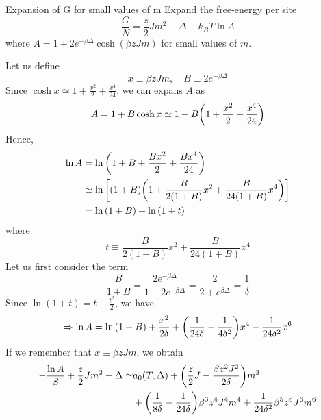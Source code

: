 \documentclass[../../Main/Main.tex]{subfiles}
\begin{document}
\begin{exercise}{Expansion of G for small values of m }{}
Expand the free-energy per site
\begin{equation*}
  \frac{G}{N} = \frac{z}{2} J m^2 - \Delta - k_B T \ln{A}
\end{equation*}
where \( A = 1 + 2 e^{-\beta \Delta } \cosh(\beta z J m) \) for small values of \( m \). 
\begin{solution}
Let us define
\begin{equation*}
  x \equiv \beta z J m, \quad B \equiv 2 e^{-\beta \Delta }
\end{equation*}
Since \( \cosh x \simeq 1 + \frac{x^2}{2} + \frac{x^4}{24} \), we can expans \(A\) as
\begin{equation*}
  A = 1 + B \cosh x \simeq 1 + B \qty(1 + \frac{x^2}{2} + \frac{x^4}{24})
\end{equation*}
Hence,
\begin{equation*}
\begin{split}
  \ln{A} &= \ln{\qty(1 + B + \frac{B x^2}{2} + \frac{B x^4}{24}) } \\
  &\simeq
  \ln{\qty[(1+B)\qty(1+ \frac{B}{2(1+B)}x^2 + \frac{B}{24(1+B)}x^4) ] } \\
  & = \ln{(1+B)} + \ln{(1+t)}
\end{split}
\end{equation*}
where
\begin{equation*}
  t \equiv \frac{B}{2(1+B)}x^2 + \frac{B}{24(1+B)}x^4
\end{equation*}
Let us first consider the term
\begin{equation*}
  \frac{B}{1+B} = \frac{2 e^{-\beta \Delta } }{1 + 2 e^{-\beta \Delta } } = \frac{2}{2+ e^{\beta \Delta } } = \frac{1}{\delta}
\end{equation*}
Since \(\ln{(1+t)} = t - \frac{t^2}{2} \), we have
\begin{equation*}
  \Rightarrow \ln{A} = \ln{(1+B)} + \frac{x^2}{2 \delta } + \qty(\frac{1}{24 \delta } - \frac{1}{4 \delta ^2})x^4 - \frac{1}{24 \delta ^2}x^6
\end{equation*}
If we remember that \( x \equiv \beta z J m\), we obtain
\begin{equation*}
\begin{split}
  - \frac{\ln{A} }{\beta} + \frac{z}{2} J m^2 - \Delta \simeq & a_0 (T,\Delta )
  + \qty(\frac{z}{2}J - \frac{\beta z^2 J^2}{2 \delta })m^2 \\
  &+ \qty(\frac{1}{8 \delta }- \frac{1}{24 \delta })\beta ^3 z^4 J^4 m^4
  + \frac{1}{24 \delta ^2} \beta ^5 z^6 J^6 m^6

\end{split}
\end{equation*}
\end{solution}
\end{exercise}
\end{document}
